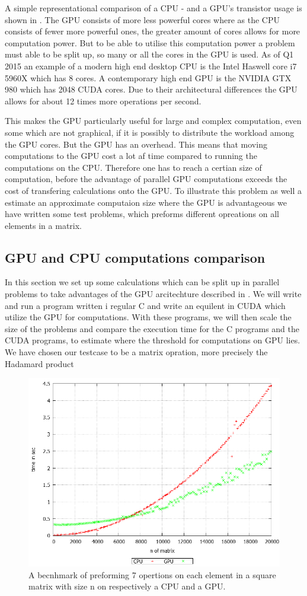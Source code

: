 A simple representational comparison of a CPU - and a GPU's transistor usage is shown in .
The GPU consists of more less powerful cores where as the CPU consists of fewer more powerful ones, the greater amount of cores allows for more computation power.
But to be able to utilise this computation power a problem must able to be split up, so many or all the cores in the GPU is used.
As of Q1 2015 an example of a modern high end desktop CPU is the Intel Haswell core i7 5960X which has 8 cores. \citep{puget}
A contemporary high end GPU is the NVIDIA GTX 980 which has 2048 CUDA cores. \citep{techpowerup,gtx980}
Due to their architectural differences the GPU allows for about 12 times more operations per second.

This makes the GPU particularly useful for large and complex computation, even some which are not graphical, if it is possibly to distribute the workload among the GPU cores.
But the GPU has an overhead.
This means that moving computations to the GPU cost a lot af time compared to running the computations on the CPU.
Therefore one has to reach a certian size of computation, before the advantage of parallel GPU computations exceeds the cost of transfering calculations onto the GPU.
To illustrate this problem as well a estimate an approximate computaion size where the GPU is advantageous we have written some test problems, which preforms different opreations on all elements in a matrix. 

\subsection{GPU and CPU computations comparison}
In this section we set up some calculations which can be split up in parallel problems to take advantages of the GPU arcitechture described in .
We will write and run a program written i regular C and write an equilent in CUDA which utilize the GPU for computations.
With these programs, we will then scale the size of the problems and compare the execution time for the C programs and the CUDA programs, to estimate where the threshold for computations on GPU lies.
We have chosen our testcase to be a matrix opration, more precisely the  Hadamard product

\begin{figure}[h!]
\centering
 \includegraphics[width=1\textwidth]{figures/benchmark.png} %
\caption{A becnhmark of preforming 7 opertions on each element in a square matrix with size n on respectively a CPU and a GPU.}\label{image:benchmark}
\vspace{-15pt}
\end{figure}
